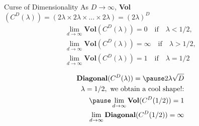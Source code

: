 \documentclass[10pt]{beamer}
\def\dimension{D}
\begin{document}
\begin{frame}{Curse of Dimensionality}
\alert{As $\dimension \to \infty$}, \textbf{Vol} $(C^{\dimension}(\lambda))= (2\lambda \times 2\lambda \times \ldots \times 2\lambda)=(2\lambda)^{\dimension}$ \pause
\begin{eqnarray*}
\lim_{d \to \infty}\textbf{Vol}(C^{\dimension}(\lambda))= 0 \quad \text{if} \quad \lambda<1/2,\\ 
\lim_{d \to \infty}\textbf{Vol}(C^{\dimension}(\lambda))= \infty \quad  \text{if} \quad \lambda>1/2,\\ 
\lim_{d \to \infty}\textbf{Vol}(C^{\dimension}(\lambda))= 1 \quad \text{if} \quad \lambda=1/2
\end{eqnarray*}

\begin{eqnarray*}
\textbf{Diagonal} (C^{\dimension}(\lambda))=\pause 2\lambda\sqrt{\dimension}\\
\lambda=1/2 ,\text{ we obtain a cool shape!:} \\ \pause
\lim_{d \to \infty}\textbf{Vol}(C^{\dimension}(1/2))= 1 \\
\lim_{d \to \infty} \textbf{Diagonal}(C^{\dimension}(1/2))= \infty
\end{eqnarray*}
\end{frame}


 
\end{document}
